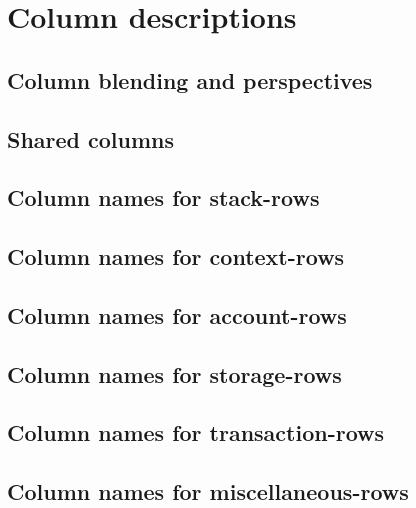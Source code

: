 

\section{Column descriptions                          \lispDone{}}    \label{hub: columns}
\subsection{Column blending and perspectives}                         \label{hub: perspectives}                    
\subsection{Shared columns                            \lispDone{}}    \label{hub: shared columns}                  
\subsection{Column names for stack-rows               \lispDone{}}    \label{hub: stack columns}                   
\subsection{Column names for context-rows             \lispDone{}}    \label{hub: context columns}                 
\subsection{Column names for account-rows             \lispDone{}}    \label{hub: account columns}                 
\subsection{Column names for storage-rows             \lispDone{}}    \label{hub: storage columns}                 
\subsection{Column names for transaction-rows         \lispDone{}}    \label{hub: transaction columns}             
\subsection{Column names for miscellaneous-rows       \lispDone{}}    \label{hub: miscellaneous columns}           
